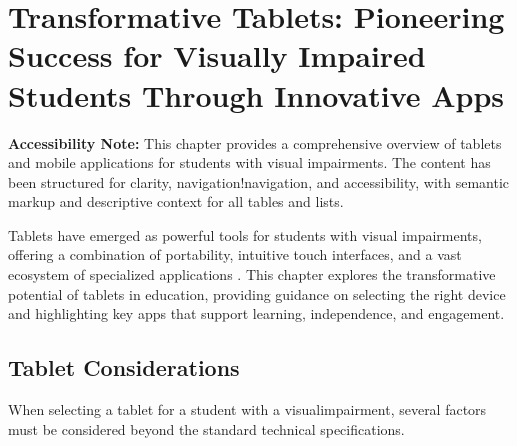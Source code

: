 \chapter{Transformative Tablets: Pioneering Success for Visually Impaired Students Through Innovative Apps}\label{ch2:tablets}

\begin{raggedright}
	\textbf{Accessibility Note:} This chapter provides a comprehensive overview of tablets and mobile applications for students with visual impairments. The content has been structured for clarity, navigation!navigation, and accessibility, with semantic markup and descriptive context for all tables and lists.
\end{raggedright}

Tablets have emerged as powerful tools for students with visual impairments, offering a combination of portability, intuitive touch interfaces, and a vast ecosystem of specialized applications \supercite{Day2021}. This chapter explores the transformative potential of tablets in education, providing guidance on selecting the right device and highlighting key apps that support learning, independence, and engagement.

\section{Tablet Considerations}\label{ch2:sec:tablet-considerations}

When selecting a \gls{tablet} for a student with a \gls{visualimpairment}, several factors must be considered beyond the standard technical specifications.

